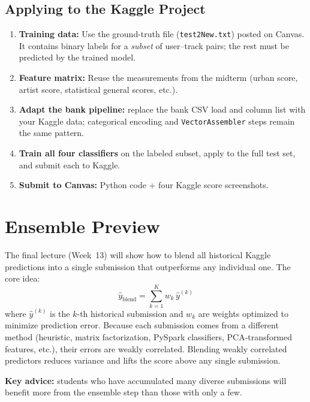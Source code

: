 \documentclass[11pt]{article}
\begin{document}
\subsection{Applying to the Kaggle Project}
\begin{enumerate}
    \item \textbf{Training data:} Use the ground-truth file (\texttt{test2New.txt}) posted on Canvas. It contains binary labels for a \emph{subset} of user--track pairs; the rest must be predicted by the trained model.
    \item \textbf{Feature matrix:} Reuse the measurements from the midterm (urban score, artist score, statistical general scores, etc.).
    \item \textbf{Adapt the bank pipeline:} replace the bank CSV load and column list with your Kaggle data; categorical encoding and \texttt{VectorAssembler} steps remain the same pattern.
    \item \textbf{Train all four classifiers} on the labeled subset, apply to the full test set, and submit each to Kaggle.
    \item \textbf{Submit to Canvas:} Python code + four Kaggle score screenshots.
\end{enumerate}

\newpage
\section{Ensemble Preview}

The final lecture (Week~13) will show how to blend all historical Kaggle predictions into a single submission that outperforms any individual one. The core idea:
\[
  \hat{y}_{\text{blend}} = \sum_{k=1}^{K} w_k\, \hat{y}^{(k)}
\]
where $\hat{y}^{(k)}$ is the $k$-th historical submission and $w_k$ are weights optimized to minimize prediction error. Because each submission comes from a different method (heuristic, matrix factorization, PySpark classifiers, PCA-transformed features, etc.), their errors are weakly correlated. Blending weakly correlated predictors reduces variance and lifts the score above any single submission.

\textbf{Key advice:} students who have accumulated many diverse submissions will benefit more from the ensemble step than those with only a few.

\newpage
\end{document}
